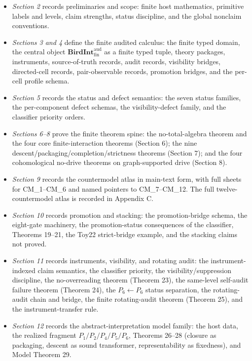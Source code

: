\documentclass[11pt]{article}
\providecommand{\tightlist}{}
\theoremstyle{definition}
\begin{document}
\begin{itemize}
\tightlist
\item
  \emph{Section 2} records preliminaries and scope: finite host mathematics, primitive labels and levels, claim strengths, status discipline, and the global nonclaim conventions.
\item
  \emph{Sections 3 and 4} define the finite audited calculus: the finite typed domain, the central object \(\mathbf{BirdInt}^{\mathrm{aud}}_{\mathrm{fin}}\) as a finite typed tuple, theory packages, instruments, source-of-truth records, audit records, visibility bridges, directed-cell records, pair-observable records, promotion bridges, and the per-cell profile schema.
\item
  \emph{Section 5} records the status and defect semantics: the seven status families, the per-component defect schemas, the visibility-defect family, and the classifier priority orders.
\item
  \emph{Sections 6--8} prove the finite theorem spine: the no-total-algebra theorem and the four core finite-interaction theorems (Section 6); the nine descent/packaging/completion/strictness theorems (Section 7); and the four cohomological no-drive theorems on graph-supported drive (Section 8).
\item
  \emph{Section 9} records the countermodel atlas in main-text form, with full sheets for CM\_1--CM\_6 and named pointers to CM\_7--CM\_12. The full twelve-countermodel atlas is recorded in Appendix C.
\item
  \emph{Section 10} records promotion and stacking: the promotion-bridge schema, the eight-gate machinery, the promotion-status consequences of the classifier, Theorems 19--21, the Toy22 strict-bridge example, and the stacking claims not proved.
\item
  \emph{Section 11} records instruments, visibility, and rotating audit: the instrument-indexed claim semantics, the classifier priority, the visibility/suppression discipline, the no-overreading theorem (Theorem 23), the same-level self-audit failure theorem (Theorem 24), the \(P_{6}\leftarrow P_{6}\) status separation, the rotating-audit chain and bridge, the finite rotating-audit theorem (Theorem 25), and the instrument-transfer rule.
\item
  \emph{Section 12} records the abstract-interpretation model family: the host data, the realized fragment \(P_{1}/P_{2}/P_{4}/P_{5}/P_{6}\), Theorems 26--28 (closure as packaging, descent as sound transformer, representability as fixedness), and Model Theorem 29.

\end{itemize}
\end{document}
